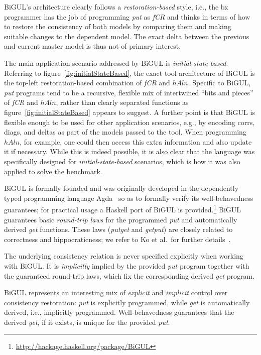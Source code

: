 BiGUL's architecture clearly follows a \emph{restoration-based} style, i.e., the bx programmer has the job of programming \emph{put} as \emph{fCR} and thinks in terms of how to restore the consistency of both models by comparing them and making suitable changes to the dependent model.
The exact delta between the previous and current master model is thus not of primary interest.

The main application scenario addressed by BiGUL is \emph{initial-state-based}.
Referring to figure~\ref{fig:initialStateBased}, the exact tool architecture of BiGUL is the top-left restoration-based combination of \emph{fCR} and $\mathit{hAln}$.
Specific to BiGUL, \emph{put} programs tend to be a recursive, flexible mix of intertwined ``bits and pieces'' of \emph{fCR} and $\mathit{hAln}$, rather than clearly separated functions as figure~\ref{fig:initialStateBased} appears to suggest.
A further point is that BiGUL is flexible enough to be used for other application scenarios, e.g., by encoding corrs, diags, and deltas as part of the models passed to the tool.
When programming $\mathit{hAln}$, for example, one could then access this extra information and also update it if necessary.
While this is indeed possible, it is also clear that the language was specifically designed for \emph{initial-state-based} scenarios, which is how it was also applied to solve the benchmark.

BiGUL is formally founded and was originally developed in the dependently typed programming language Agda~\cite{AFP08-Norell} so as to formally verify its well-behavedness guarantees; for practical usage a Haskell port of BiGUL is provided.\footnote{\url{http://hackage.haskell.org/package/BiGUL}}
BiGUL guarantees basic \emph{round-trip laws} for the programmed \emph{put} and automatically derived \emph{get} functions.
These laws (\emph{putget} and \emph{getput}) are closely related to correctness and hippocraticness; we refer to Ko et al.~for further details~\cite{PEPM2016-Ko}.

The underlying consistency relation is never specified explicitly when working with BiGUL.
It is \emph{implicitly} implied by the provided \emph{put} program together with the guaranteed round-trip laws, which fix the corresponding derived \emph{get} program.

BiGUL represents an interesting mix of \emph{explicit} and \emph{implicit} control over consistency restoration:  \emph{put} is explicitly programmed, while \emph{get} is automatically derived, i.e., implicitly programmed.
Well-behavedness guarantees that the derived \emph{get}, if it exists, is unique for the provided \emph{put}.

